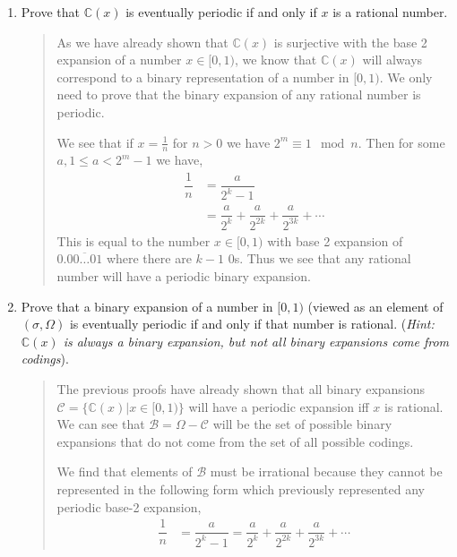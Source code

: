 \documentclass[letter]{article}
\newcommand{\C}{\mathbb{C}}
\begin{document}
\begin{enumerate}
\begin{enumerate}
			
			\item Prove that $\C(x)$ is eventually periodic if and only if $x$ is a rational number.

			\begin{quote}
		        As we have already shown that $\C(x)$ is surjective with the base 2 expansion of a number $x \in [0,1)$, we know that $\C(x)$ will always correspond to a binary representation of a number in $[0,1)$. We only need to prove that the binary expansion of any rational number is periodic.
		        
		        We see that if $x = \frac{1}{n}$ for $n>0$ we have $2^m \equiv 1 \mod n$. Then for some $a, 1 \leq a < 2^m-1$ we have,
		        \begin{align*}
		            \dfrac{1}{n} &= \dfrac{a}{2^k-1} \\
		            &= \dfrac{a}{2^k} + \dfrac{a}{2^{2k}} + \dfrac{a}{2^{3k}} + \cdots
		        \end{align*}
		        This is equal to the number $x  \in [0,1) $ with base 2 expansion of $0.\overline{00\dots01}$ where there are $k-1$ $0$s. Thus we see that any rational number will have a periodic binary expansion.
			\end{quote}

			\item Prove that a binary expansion of a number in $[0,1)$  (viewed as an element of $(\sigma, \Omega)$ 
				is eventually periodic if and only
				if that number is rational. (\emph{Hint: $\C(x)$ is always a binary expansion, but not all
				binary expansions come from codings}).
				
			\begin{quote}
			    The previous proofs have already shown that all binary expansions $\mathcal C = \{ \C(x) | x \in [0,1) \}$ will have a periodic expansion iff $x$ is rational. We can see that $\mathcal B = \Omega - \mathcal C$ will be the set of possible binary expansions that do not come from the set of all possible codings.
			    
			    We find that elements of $\mathcal B$ must be irrational because they cannot be represented in the following form which previously represented any periodic base-2 expansion,
		        \begin{align*}
		            \dfrac{1}{n} &= \dfrac{a}{2^k-1} 
		            = \dfrac{a}{2^k} + \dfrac{a}{2^{2k}} + \dfrac{a}{2^{3k}} + \cdots
		        \end{align*}
			\end{quote}
				

\end{enumerate}
\end{enumerate}
\end{document}

